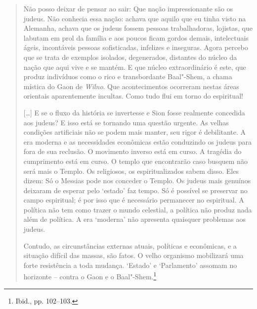 \begin{quote}
Não posso deixar de pensar ao sair: Que nação impressionante são os
judeus. Não conhecia essa nação: achava que aquilo que eu tinha visto na
Alemanha, achava que os judeus fossem pessoas trabalhadoras, lojistas,
que labutam em prol da família e aos poucos ficam gordos demais,
intelectuais ágeis, incontáveis pessoas sofisticadas, infelizes e
inseguras. Agora percebo que se trata de exemplos isolados, degenerados,
distantes do núcleo da nação que aqui vive e se mantém. E que núcleo
extraordinário é este, que produz indivíduos como o rico e transbordante
Baal"-Shem, a chama mística do Gaon de \textit{Wilno}. Que acontecimentos
ocorreram nestas áreas orientais aparentemente incultas. Como tudo flui
em torno do espiritual!

[\ldots{}] E se o fluxo da história se invertesse e Sion fosse realmente
concedida aos judeus? E isso está se tornando uma questão urgente. As
velhas condições artificiais não se podem mais manter, seu rigor é
debilitante. A era moderna e as necessidades econômicas estão conduzindo
os judeus para fora de sua reclusão. O movimento inverso está em curso.
A tragédia do cumprimento está em curso. O templo que encontrarão caso
busquem não será mais o Templo. Os religiosos, os espiritualizados sabem
disso. Eles dizem: Só o Messias pode nos conceder o Templo. Os judeus
mais genuínos deixaram de esperar pelo `estado' faz tempo. Só é possível
se preservar no campo espiritual; é por isso que é necessário permanecer
no espiritual. A política não tem como trazer o mundo celestial, a
política não produz nada além de política. A era `moderna' não apresenta
quaisquer problemas aos judeus.

Contudo, as circunstâncias externas atuais, políticas e econômicas, e a
situação difícil das massas, são fatos. O velho organismo mobilizará uma
forte resistência a toda mudança. `Estado' e `Parlamento' assomam no
horizonte -- contra o Gaon e o Baal"-Shem.\footnote{Ibid., pp. 102--103.}
\end{quote}

